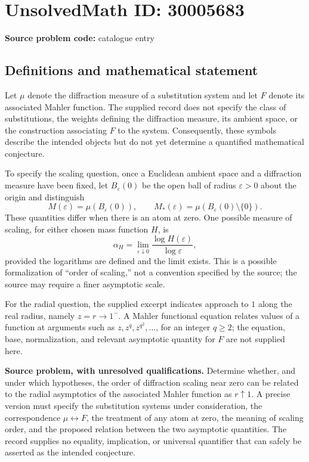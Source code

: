 \documentclass[11pt]{article}
\begin{document}
\section*{UnsolvedMath ID: 30005683}
\textbf{Source problem code:} catalogue entry
\subsection{Definitions and mathematical statement}
Let \(\mu\) denote the diffraction measure of a substitution system and let \(F\) denote its associated Mahler function. The supplied record does not specify the class of substitutions, the weights defining the diffraction measure, its ambient space, or the construction associating \(F\) to the system. Consequently, these symbols describe the intended objects but do not yet determine a quantified mathematical conjecture.

To specify the scaling question, once a Euclidean ambient space and a diffraction measure have been fixed, let \(B_\varepsilon(0)\) be the open ball of radius \(\varepsilon>0\) about the origin and distinguish
\[
M(\varepsilon)=\mu(B_\varepsilon(0)),\qquad
M_*(\varepsilon)=\mu(B_\varepsilon(0)\setminus\{0\}).
\]
These quantities differ when there is an atom at zero. One possible measure of scaling, for either chosen mass function \(H\), is
\[
\alpha_H=\lim_{\varepsilon\downarrow0}
\frac{\log H(\varepsilon)}{\log\varepsilon},
\]
provided the logarithms are defined and the limit exists. This is a possible formalization of ``order of scaling,'' not a convention specified by the source; the source may require a finer asymptotic scale.

For the radial question, the supplied excerpt indicates approach to \(1\) along the real radius, namely \(z=r\to1^-\). A Mahler functional equation relates values of a function at arguments such as \(z,z^q,z^{q^2},\ldots\), for an integer \(q\ge2\); the equation, base, normalization, and relevant asymptotic quantity for \(F\) are not supplied here.

\textbf{Source problem, with unresolved qualifications.} Determine whether, and under which hypotheses, the order of diffraction scaling near zero can be related to the radial asymptotics of the associated Mahler function as \(r\uparrow1\). A precise version must specify the substitution systems under consideration, the correspondence \(\mu\leftrightarrow F\), the treatment of any atom at zero, the meaning of scaling order, and the proposed relation between the two asymptotic quantities. The record supplies no equality, implication, or universal quantifier that can safely be asserted as the intended conjecture.
\end{document}
